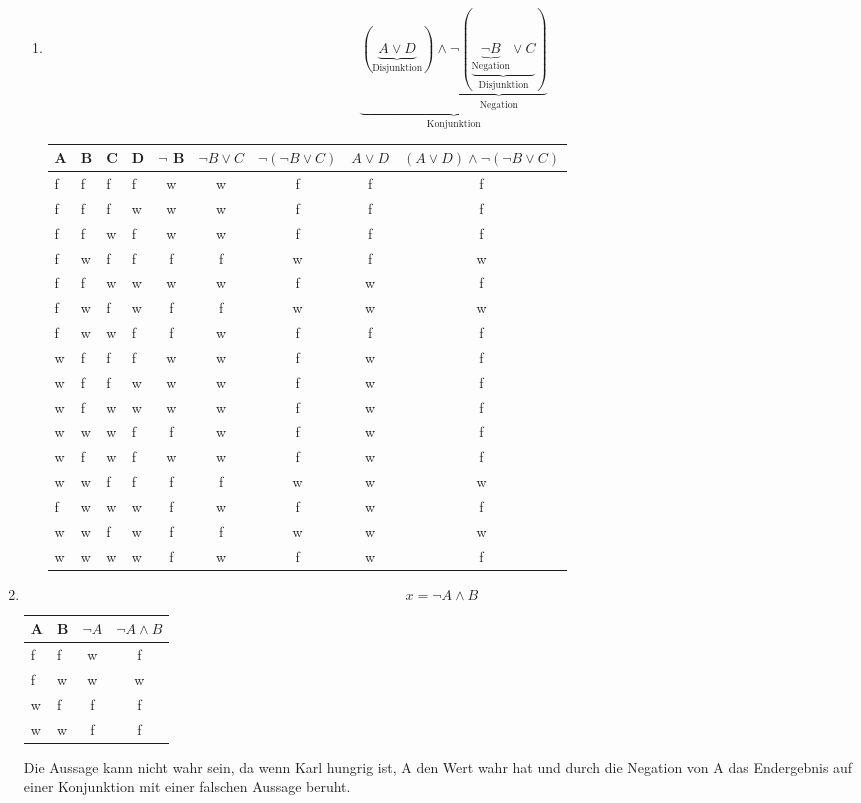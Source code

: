 \documentclass[a4paper]{article}
\begin{document}
\begin{enumerate}
\begin{enumerate}
			\item
			\begin{equation*}
				\underbrace{(\underbrace{A \lor D}_{\text{Disjunktion}}) \land \underbrace{\lnot (\underbrace{\underbrace{\lnot B}_{\text{Negation}} \lor C}_{\text{Disjunktion}})}_{\text{Negation}}}_{\text{Konjunktion}}
			\end{equation*}
			\begin{tabular}{|l|l|l|l|c|c|c|c|c|}
				\firsthline
				A & B & C & D & $\lnot$ B & $\lnot B \lor C$ & $\lnot (\lnot B \lor C)$ & $A \lor D$ & $(A \lor D) \land \lnot (\lnot B \lor C)$ \\
				\hline
				f & f & f & f & w & w & f & f & f \\	
				f & f & f & w & w & w & f & f & f \\
				f & f & w & f & w & w & f & f & f \\
				f & w & f & f & f & f & w & f & w \\
				f & f & w & w & w & w & f & w & f \\
				f & w & f & w & f & f & w & w & w \\
				f & w & w & f & f & w & f & f & f \\
				w & f & f & f & w & w & f & w & f \\
				w & f & f & w & w & w & f & w & f \\
				w & f & w & w & w & w & f & w & f \\
				w & w & w & f & f & w & f & w & f \\
				w & f & w & f & w & w & f & w & f \\
				w & w & f & f & f & f & w & w & w \\
				f & w & w & w & f & w & f & w & f \\
				w & w & f & w & f & f & w & w & w \\
				w & w & w & w & f & w & f & w & f \\
				\hline
			\end{tabular}
		\end{enumerate}
		
		\item
		\begin{equation*}
			x = \lnot A \land B
		\end{equation*}
		\begin{tabular}{|l|l|c|c|}
			\firsthline
			A & B & $\lnot A$ & $ \lnot A \land B $ \\
			\hline
			f & f & w & f \\
			f & w & w & w \\
			w & f & f & f \\
			w & w & f & f \\
			\hline
		\end{tabular}
		\newline
		Die Aussage kann nicht wahr sein, da wenn Karl hungrig ist, A den Wert wahr hat und durch die Negation von A das Endergebnis auf einer Konjunktion mit einer falschen Aussage beruht.
		

\end{enumerate}
\end{document}
